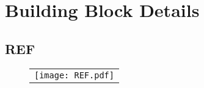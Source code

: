 \documentclass[a4paper,12pt]{article}
\begin{document}














\section{Building Block Details}
\subsection{REF}
   \begin{figure}
   \begin{center}
   \begin{tabular}{c}
   \texttt{[image: REF.pdf]}
   \end{tabular}
   \end{center}
   \end{figure}
\end{document}
